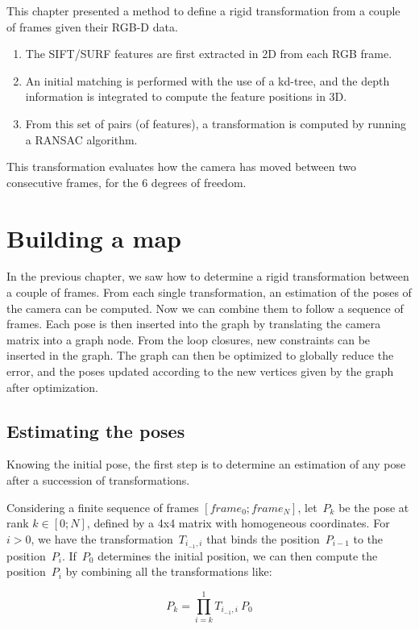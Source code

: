 This chapter presented a method to define a rigid transformation from a couple of frames given their RGB-D data.
\begin{enumerate}
\item The \gls{SIFT}/\gls{SURF} features are first extracted in 2D from each RGB frame.
\item An initial matching is performed with the use of a kd-tree, and the depth information is integrated to compute the feature positions in 3D.
\item From this set of pairs (of features), a transformation is computed by running a \gls{RANSAC} algorithm.
\end{enumerate}

This transformation evaluates how the camera has moved between two consecutive frames, for the 6 degrees of freedom.

\chapter{Building a map}
\label{chap:map}

In the previous chapter, we saw how to determine a rigid transformation between a couple of frames. From each single transformation, an estimation of the poses of the camera can be computed. Now we can combine them to follow a sequence of frames. Each pose is then inserted into the graph by translating the camera matrix into a graph node. From the loop closures, new constraints can be inserted in the graph. The graph can then be optimized to globally reduce the error, and the poses updated according to the new vertices given by the graph after optimization.

\section{Estimating the poses}

Knowing the initial pose, the first step is to determine an estimation of any pose after a succession of transformations.

Considering a finite sequence of frames $[frame_0 ; frame_N]$, let~$P_k$ be the pose at rank $k \in [0;N]$, defined by a 4x4 matrix with homogeneous coordinates. For~$i>0$, we have the transformation~$T_{i_{-1},i}$ that binds the position~$P_{i-1}$ to the position~$P_i$. If~$P_0$ determines the initial position, we can then compute the position~$P_i$  by combining all the transformations like:

\begin{equation}
P_k = \prod_{i=k}^1{T_{i_{-1},i}} \: P_0
\label{eqn:pose_estimation}
\end{equation}

